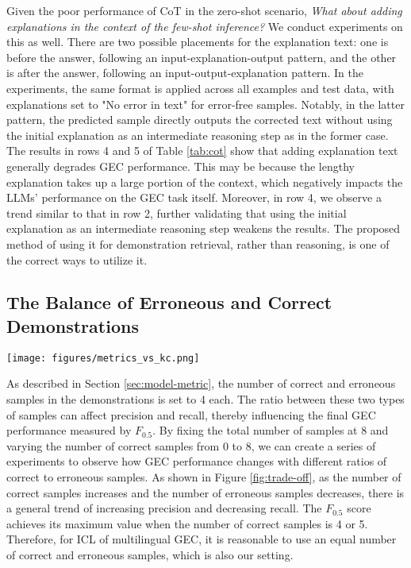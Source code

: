 Given the poor performance of CoT in the zero-shot scenario, \textit{What about adding explanations in the context of the few-shot inference?} We conduct experiments on this as well. There are two possible placements for the explanation text: one is before the answer, following an input-explanation-output pattern, and the other is after the answer, following an input-output-explanation pattern. In the experiments, the same format is applied across all examples and test data, with explanations set to "No error in text" for error-free samples. Notably, in the latter pattern, the predicted sample directly outputs the corrected text without using the initial explanation as an intermediate reasoning step as in the former case. The results in rows 4 and 5 of Table \ref{tab:cot} show that adding explanation text generally degrades GEC performance. This may be because the lengthy explanation takes up a large portion of the context, which negatively impacts the LLMs' performance on the GEC task itself. Moreover, in row 4, we observe a trend similar to that in row 2, further validating that using the initial explanation as an intermediate reasoning step weakens the results. The proposed method of using it for demonstration retrieval, rather than reasoning, is one of the correct ways to utilize it.


\subsection{The Balance of Erroneous and Correct Demonstrations}

\begin{figure*}[ht]
    \centering
    \texttt{[image: figures/metrics\_vs\_kc.png]}
    \caption{GEC metrics on 4 datasets as the number of the correct samples $k_C$ varies, with a total of $k_E + k_C = 8$ in-context demonstrations consisting of both erroneous and correct samples.}
    \label{fig:trade-off}
\end{figure*}

As described in Section \ref{sec:model-metric}, the number of correct and erroneous samples in the demonstrations is set to 4 each. The ratio between these two types of samples can affect precision and recall, thereby influencing the final GEC performance measured by $F_{0.5}$. By fixing the total number of samples at 8 and varying the number of correct samples from 0 to 8, we can create a series of experiments to observe how GEC performance changes with different ratios of correct to erroneous samples. As shown in Figure \ref{fig:trade-off}, as the number of correct samples increases and the number of erroneous samples decreases, there is a general trend of increasing precision and decreasing recall. The $F_{0.5}$ score achieves its maximum value when the number of correct samples is 4 or 5. Therefore, for ICL of multilingual GEC, it is reasonable to use an equal number of correct and erroneous samples, which is also our setting.



